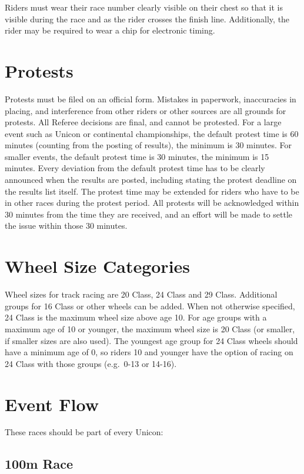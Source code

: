 Riders must wear their race number clearly visible on their chest so that it is visible during the race and as the rider crosses the finish line.
Additionally, the rider may be required to wear a chip for electronic timing.

\section{Protests}

Protests must be filed on an official form.
Mistakes in paperwork, inaccuracies in placing, and interference from other riders or other sources are all grounds for protests.
All Referee decisions are final, and cannot be protested.
For a large event such as Unicon or continental championships, the default protest time is 60 minutes (counting from the posting of results), the minimum is 30 minutes.
For smaller events, the default protest time is 30 minutes, the minimum is 15 minutes.
Every deviation from the default protest time has to be clearly announced when the results are posted, including stating the protest deadline on the results list itself.
The protest time may be extended for riders who have to be in other races during the protest period.
All protests will be acknowledged within 30 minutes from the time they are received, and an effort will be made to settle the issue within those 30 minutes.

\section{Wheel Size Categories}

Wheel sizes for track racing are 20 Class, 24 Class and 29 Class.
Additional groups for 16 Class or other wheels can be added.
When not otherwise specified, 24 Class is the maximum wheel size above age 10.
For age groups with a maximum age of 10 or younger, the maximum wheel size is 20 Class (or smaller, if smaller sizes are also used).
The youngest age group for 24 Class wheels should have a minimum age of 0, so riders 10 and younger have the option of racing on 24 Class with those groups (e.g.\ 0-13 or 14-16).

\section{Event Flow}

These races should be part of every Unicon:

\subsection{100m Race}

